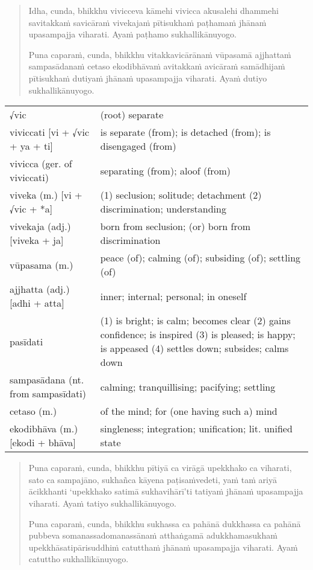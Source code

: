 \documentclass[11pt,oneside]{memoir}
\begin{document}
\begin{quote}
Idha, cunda, bhikkhu vivicceva kāmehi vivicca akusalehi dhammehi savitakkaṁ
savicāraṁ vivekajaṁ pītisukhaṁ paṭhamaṁ jhānaṁ upasampajja viharati. Ayaṁ
paṭhamo sukhallikānuyogo.

Puna caparaṁ, cunda, bhikkhu vitakkavicārānaṁ vūpasamā
ajjhattaṁ sampasādanaṁ cetaso ekodibhāvaṁ avitakkaṁ avicāraṁ samādhijaṁ pītisukhaṁ
dutiyaṁ jhānaṁ upasampajja viharati. Ayaṁ dutiyo sukhallikānuyogo.
\end{quote}

\begin{longtable}{L{\colOne} L{\colTwo}}
√vic & (root) separate\\[0pt]
viviccati [vi + √vic + ya + ti] & is separate (from); is detached (from); is disengaged (from)\\[0pt]
vivicca (ger. of viviccati) & separating (from); aloof (from)\\[0pt]
viveka (m.) [vi + √vic + *a] & (1) seclusion; solitude; detachment (2) discrimination; understanding\\[0pt]
vivekaja (adj.) [viveka + ja] & born from seclusion; (or) born from discrimination\\[0pt]
vūpasama (m.) & peace (of); calming (of); subsiding (of); settling (of)\\[0pt]
ajjhatta (adj.) [adhi + atta] & inner; internal; personal; in oneself\\[0pt]
pasīdati & (1) is bright; is calm; becomes clear (2) gains confidence; is inspired (3) is pleased; is happy; is appeased (4) settles down; subsides; calms down\\[0pt]
sampasādana (nt. from sampasīdati) & calming; tranquillising; pacifying; settling\\[0pt]
cetaso (m.) & of the mind; for (one having such a) mind\\[0pt]
ekodibhāva (m.) [ekodi + bhāva] & singleness; integration; unification; lit. unified state\\[0pt]
\end{longtable}

\begin{quote}
Puna caparaṁ, cunda, bhikkhu pītiyā ca virāgā
upekkhako ca viharati, sato ca sampajāno, sukhañca kāyena paṭisaṁvedeti,
yaṁ taṁ ariyā ācikkhanti ‘upekkhako satimā sukhavihārī’ti
tatiyaṁ jhānaṁ upasampajja viharati. Ayaṁ tatiyo sukhallikānuyogo.

Puna caparaṁ, cunda, bhikkhu sukhassa ca pahānā dukkhassa ca pahānā
pubbeva somanassadomanassānaṁ atthaṅgamā adukkhamasukhaṁ upekkhāsatipārisuddhiṁ
catutthaṁ jhānaṁ upasampajja viharati. Ayaṁ catuttho sukhallikānuyogo.
\end{quote}
\end{document}
